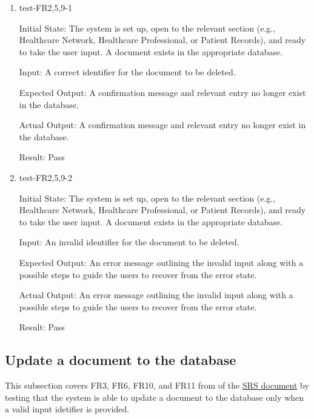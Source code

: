 \documentclass[12pt, titlepage]{article}
\begin{document}
\begin{enumerate}

  \item{test-FR2,5,9-1} \label{test-FR2,5,9-1}
  
  Initial State: The system is set up, open to the relevant section (e.g., Healthcare Network, Healthcare Professional, or Patient Records), and ready to take the user input. A document exists in the appropriate database.

  Input: A correct identifier for the document to be deleted.

  Expected Output: A confirmation message and relevant entry no longer exist in the database.

  Actual Output: A confirmation message and relevant entry no longer exist in the database.

  Result: Pass


  \item{test-FR2,5,9-2} \label{test-FR2,5,9-2}

  Initial State: The system is set up, open to the relevant section (e.g., Healthcare Network, Healthcare Professional, or Patient Records), and ready to take the user input. A document exists in the appropriate database.

  Input: An invalid identifier for the document to be deleted.

  Expected Output: An error message outlining the invalid input along with a possible steps to guide the users to recover from the error state.

  Actual Output: An error message outlining the invalid input along with a possible steps to guide the users to recover from the error state.

  Result: Pass

\end{enumerate}

\subsection{Update a document to the database} \label{section:3.3}

This subsection covers FR3, FR6, FR10, and FR11 from of the \href{https://github.com/Inreet-Kaur/capstone/blob/main/docs/SRS/SRS.pdf}{SRS document} by testing that the system is able to update a document to the database only when a valid input idetifier is provided.
\end{document}

